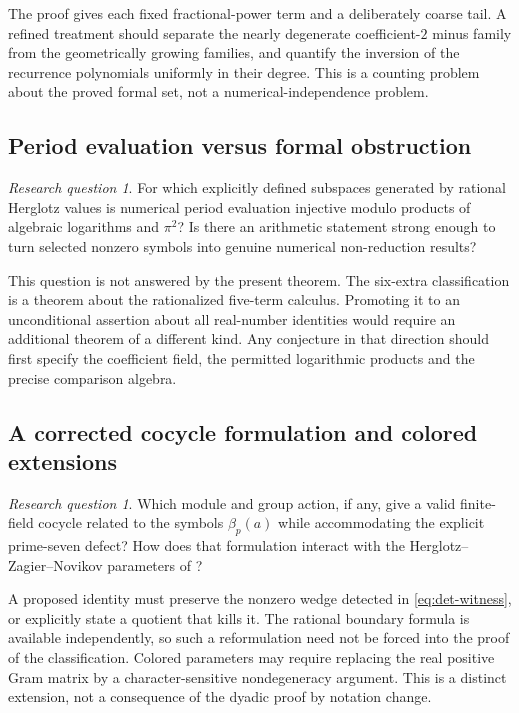 \documentclass[11pt]{article}
\numberwithin{equation}{section}
\theoremstyle{definition}
\theoremstyle{remark}
\newtheorem{question}[theorem]{Research question}
\begin{document}
The proof gives each fixed fractional-power term and a deliberately
coarse tail. A refined treatment should separate the nearly degenerate
coefficient-$2$ minus family from the geometrically growing families,
and quantify the inversion of the recurrence polynomials uniformly in
their degree. This is a counting problem about the proved formal set,
not a numerical-independence problem.

\subsection{Period evaluation versus formal obstruction}

\begin{question}\label{question:periods}
For which explicitly defined subspaces generated by rational Herglotz
values is numerical period evaluation injective modulo products of
algebraic logarithms and $\pi^2$? Is there an arithmetic statement
strong enough to turn selected nonzero symbols into genuine numerical
non-reduction results?
\end{question}

This question is not answered by the present theorem. The six-extra
classification is a theorem about the rationalized five-term calculus.
Promoting it to an unconditional assertion about all real-number
identities would require an additional theorem of a different kind.
Any conjecture in that direction should first specify the coefficient
field, the permitted logarithmic products and the precise comparison
algebra.

\subsection{A corrected cocycle formulation and colored extensions}

\begin{question}\label{question:cocycle}
Which module and group action, if any, give a valid finite-field cocycle
related to the symbols $\beta_p(a)$ while accommodating the explicit
prime-seven defect? How does that formulation interact with the
Herglotz--Zagier--Novikov parameters of \cite{CK}?
\end{question}

A proposed identity must preserve the nonzero wedge detected in
\eqref{eq:det-witness}, or explicitly state a quotient that kills it.
The rational boundary formula is available independently, so such a
reformulation need not be forced into the proof of the classification.
Colored parameters may require replacing the real positive Gram matrix
by a character-sensitive nondegeneracy argument. This is a distinct
extension, not a consequence of the dyadic proof by notation change.
\end{document}
